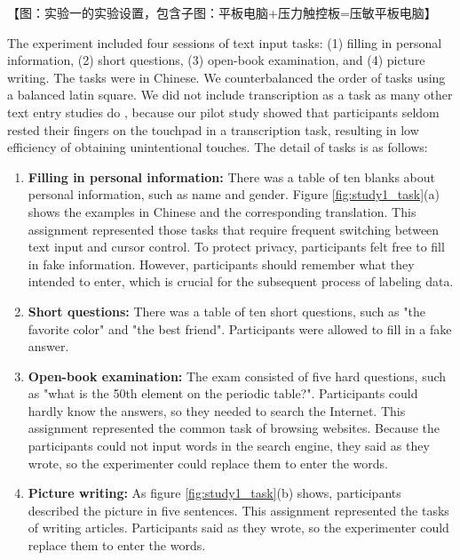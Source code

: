 【图：实验一的实验设置，包含子图：平板电脑+压力触控板=压敏平板电脑】


The experiment included four sessions of text input tasks: (1) filling in personal information, (2) short questions, (3) open-book examination, and (4) picture writing. The tasks were in Chinese. We counterbalanced the order of tasks using a balanced latin square. We did not include transcription as a task as many other text entry studies do \cite{2003-Metrics, 2003-Phrase, 2017-Word}, because our pilot study showed that participants seldom rested their fingers on the touchpad in a transcription task, resulting in low efficiency of obtaining unintentional touches. The detail of tasks is as follows:


\begin{enumerate}
	\item{\textbf{Filling in personal information:} There was a table of ten blanks about personal information, such as name and gender. Figure \ref{fig:study1_task}(a) shows the examples in Chinese and the corresponding translation. This assignment represented those tasks that require frequent switching between text input and cursor control. To protect privacy, participants felt free to fill in fake information. However, participants should remember what they intended to enter, which is crucial for the subsequent process of labeling data.}
	\item{\textbf{Short questions:} There was a table of ten short questions, such as "the favorite color" and "the best friend". Participants were allowed to fill in a fake answer.}
	\item{\textbf{Open-book examination:} The exam consisted of five hard questions, such as "what is the 50th element on the periodic table?". Participants could hardly know the answers, so they needed to search the Internet. This assignment represented the common task of browsing websites. Because the participants could not input words in the search engine, they said as they wrote, so the experimenter could replace them to enter the words.}
	\item{\textbf{Picture writing:} As figure \ref{fig:study1_task}(b) shows, participants described the picture in five sentences. This assignment represented the tasks of writing articles. Participants said as they wrote, so the experimenter could replace them to enter the words.}
\end{enumerate}

